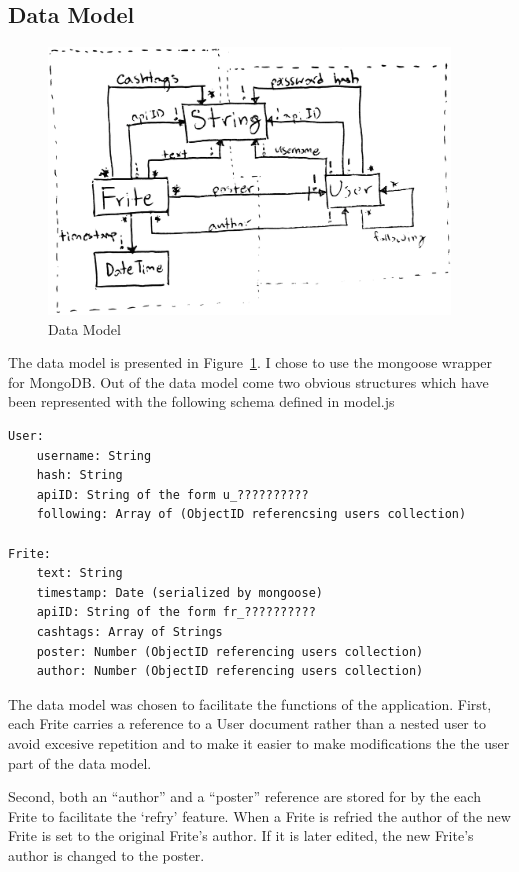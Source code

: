 \documentclass{amsart}
\begin{document}
\subsection{Data Model}
\begin{figure}[htbp]
    \centering
    \includegraphics[width=0.95\textwidth]{model.png}
    \caption{Data Model}
    \label{fig:datamodel}
\end{figure}
The data model is presented in Figure~\ref{fig:datamodel}. I chose to use the mongoose wrapper for MongoDB.
Out of the data model come two obvious structures which have been represented with the following schema
defined in model.js
\begin{verbatim}
User:
    username: String
    hash: String
    apiID: String of the form u_??????????
    following: Array of (ObjectID referencsing users collection)

Frite:
    text: String
    timestamp: Date (serialized by mongoose)
    apiID: String of the form fr_??????????
    cashtags: Array of Strings
    poster: Number (ObjectID referencing users collection)
    author: Number (ObjectID referencing users collection)
\end{verbatim}
The data model was chosen to facilitate the functions of the application. First, each Frite
carries a reference to a User document rather than a nested user to avoid excesive repetition
and to make it easier to make modifications the the user part of the data model.

Second, both an ``author'' and a ``poster'' reference are stored for by the each Frite
to facilitate the `refry' feature. When a Frite is refried the author of the new Frite
is set to the original Frite's author. If it is later edited, the new Frite's author is
changed to the poster.
\end{document}
